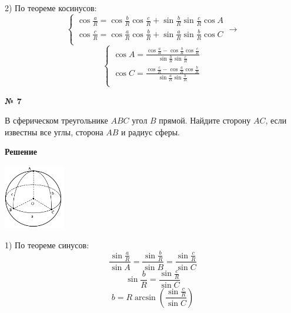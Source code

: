     2) По теореме косинусов:
    \[
        \begin{cases}
            \cos\frac{a}{R} = \cos\frac{b}{R}\cos\frac{c}{R} + \sin\frac{b}{R}\sin\frac{c}{R}\cos A\\
            \cos\frac{c}{R} = \cos\frac{a}{R}\cos\frac{b}{R} + \sin\frac{a}{R}\sin\frac{b}{R}\cos C\\
        \end{cases}
        \rightarrow
    \]
    \[
        \begin{cases}
            \cos A = \frac{\cos\frac{a}{R} - \cos\frac{b}{R}\cos\frac{c}{R}}{\sin\frac{b}{R}\sin\frac{c}{R}}\\
            \cos C = \frac{\cos\frac{c}{R} - \cos\frac{a}{R}\cos\frac{b}{R}}{\sin\frac{a}{R}\sin\frac{b}{R}}\\
        \end{cases}
    \]

     \begin{center}
        \textbf{№ 7}
    \end{center}

    В сферическом треугольнике $ABC$ угол $B$ прямой.
    Найдите сторону $AC$, если известны все углы, сторона $AB$ и радиус сферы.

    \textbf{Решение}\\

    \begin{center}
        \includegraphics[width=0.2\textwidth]{images/img9}\\
    \end{center}

    1) По теореме синусов:
    \[
        \frac{\sin\frac{a}{R}}{\sin A} = \frac{\sin\frac{b}{R}}{\sin B} = \frac{\sin\frac{c}{R}}{\sin C}
    \]
    \[
        \sin\frac{b}{R} = \frac{\sin\frac{c}{R}}{\sin C}
    \]
    \[
        b = R\arcsin\left(\frac{\sin\frac{c}{R}}{\sin C}\right)
    \]


